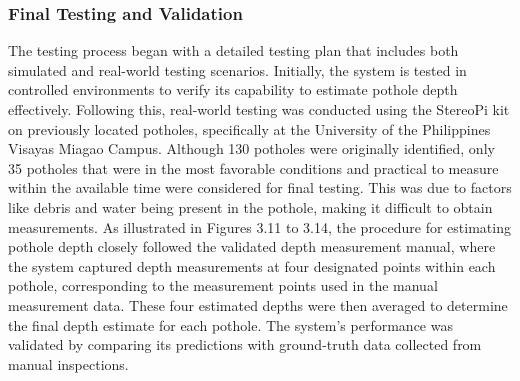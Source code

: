 \subsubsection{Final Testing and Validation}
The testing process began with a detailed testing plan that includes both simulated and real-world testing scenarios. Initially, the system is tested in controlled environments to verify its capability to estimate pothole depth effectively. Following this, real-world testing was conducted using the StereoPi kit on previously located potholes, specifically at the University of the Philippines Visayas Miagao Campus. Although 130 potholes were originally identified, only 35 potholes that were in the most favorable conditions and practical to measure within the available time were considered for final testing. This was due to factors like debris and water being present in the pothole, making it difficult to obtain measurements. As illustrated in Figures 3.11 to 3.14, the procedure for estimating pothole depth closely followed the validated depth measurement manual, where the system captured depth measurements at four designated points within each pothole, corresponding to the measurement points used in the manual measurement data. These four estimated depths were then averaged to determine the final depth estimate for each pothole. The system’s performance was validated by comparing its predictions with ground-truth data collected from manual inspections.

